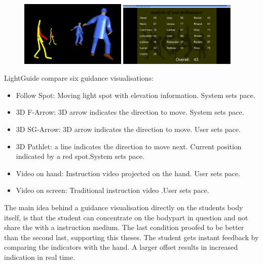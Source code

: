 \begin{figure}
	\centering
	\includegraphics[width=0.45\textwidth]{img/VRDanceTrainerPractice.png}
	\includegraphics[width=0.5\textwidth]{img/VRDanceTrainerScoreBoard.png}
	\caption{\todo \cite{Chan2011}}
	\label{fig:vrdt}
\end{figure}
LightGuide \cite{Sodhi2012} compare six guidance visualisations:
\begin{itemize}
	\item Follow Spot: Moving light spot with elevation information. System sets pace.
	\item 3D F-Arrow: 3D arrow indicates the direction to move. System sets pace.
	\item 3D SG-Arrow: 3D arrow indicates the direction to move. User sets pace.
	\item 3D Pathlet: a line indicates the direction to move next. Current position indicated by a red spot.System sets pace.
	\item Video on hand: Instruction video projected on the hand. User sets pace.
	\item Video on screen: Traditional instruction video .User sets pace.
\end{itemize}
The main idea behind a guidance visualisation directly on the students body itself, is that the student can concentrate on the bodypart in question and not share the  with a instruction medium. The last condition proofed to be better than the second last, supporting this theses.
The student gets instant feedback by comparing the indicators with the hand. A larger offset results in increased indication in real time.


